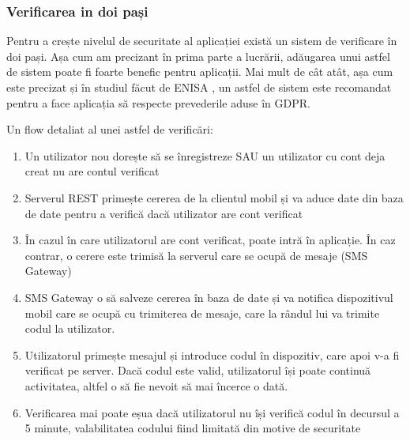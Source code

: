 \documentclass[12pt]{article}
\begin{document}
\newpage

\subsubsection{Verificarea in doi pași}

Pentru a crește nivelul de securitate al aplicației există un sistem de verificare
în doi pași. Așa cum am precizant în prima parte a lucrării, adăugarea unui astfel de sistem
poate fi foarte benefic pentru aplicații.
Mai mult de cât atât, așa cum este precizat și în studiul făcut de ENISA \cite{enisa-2019}, un
astfel de sistem este recomandat pentru a face aplicația să respecte prevederile aduse în GDPR. 

\bigskip

Un flow detaliat al unei astfel de verificări:

\begin{enumerate}
    \item Un utilizator nou dorește să se înregistreze SAU un utilizator cu cont deja creat
    nu are contul verificat
    \item Serverul REST primește cererea de la clientul mobil și va aduce date din baza de date pentru
    a verifică dacă utilizator are cont verificat
    \item În cazul în care utilizatorul are cont verificat, poate intră în aplicație. În caz contrar,
    o cerere este trimisă la serverul care se ocupă de mesaje (SMS Gateway)
    \item SMS Gateway o să salveze cererea în baza de date și va notifica dispozitivul mobil 
    care se ocupă cu trimiterea de mesaje, care la rândul lui va trimite codul la utilizator.
    \item Utilizatorul primește mesajul și introduce codul în dispozitiv, care apoi v-a fi verificat 
    pe server. Dacă codul este valid, utilizatorul își poate continuă activitatea, altfel o să fie nevoit
    să mai încerce o dată.
    \item Verificarea mai poate eșua dacă utilizatorul nu își verifică codul în decursul a 5 minute, valabilitatea
    codului fiind limitată din motive de securitate
\end{enumerate}
\end{document}
